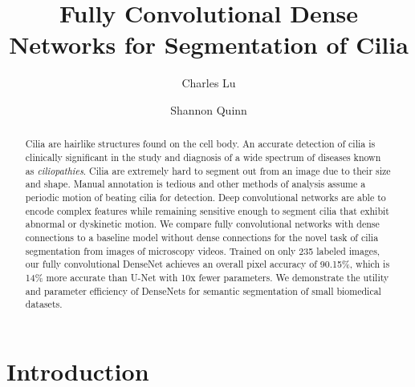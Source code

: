 \documentclass{llncs}
\begin{document}
\frontmatter          %
\pagestyle{headings}  %
\mainmatter              %


\title{Fully Convolutional Dense Networks for Segmentation of Cilia}
\author{Charles Lu \and
Shannon Quinn}
\tocauthor{}
\maketitle              %


\begin{abstract}
Cilia are hairlike structures found on the cell body. An accurate detection of cilia is clinically significant in the study and diagnosis of a wide spectrum of diseases known as \textit{ciliopathies}. Cilia are extremely hard to segment out from an image due to their size and shape. Manual annotation is tedious and other methods of analysis assume a periodic motion of beating cilia for detection. Deep convolutional networks are able to encode complex features while remaining sensitive enough to segment cilia that exhibit abnormal or dyskinetic motion. We compare fully convolutional networks with dense connections to a baseline model without dense connections for the novel task of cilia segmentation from images of microscopy videos. Trained on only 235 labeled images, our fully convolutional DenseNet achieves an overall pixel accuracy of 90.15\%, which is 14\% more accurate than U-Net with 10x fewer parameters. We demonstrate the utility and parameter efficiency of DenseNets for semantic segmentation of small biomedical datasets.

\end{abstract}


\section{Introduction}
\end{document}
